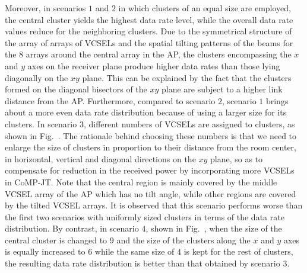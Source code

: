 \documentclass[lettersize,journal]{IEEEtran}
\begin{document}
Moreover, in scenarios $1$ and $2$ in which clusters of an equal size are employed, the central cluster yields the highest data rate level, while the overall data rate values reduce for the neighboring clusters. Due to the symmetrical structure of the array of arrays of \acp{VCSEL} and the spatial tilting patterns of the beams for the $8$ arrays around the central array in the \ac{AP}, the clusters encompassing the $x$ and $y$ axes on the receiver plane produce higher data rates than those lying diagonally on the $xy$ plane. This can be explained by the fact that the clusters formed on the diagonal bisectors of the $xy$ plane are subject to a higher link distance from the \ac{AP}. Furthermore, compared to scenario $2$, scenario $1$ brings about a more even data rate distribution because of using a larger size for its clusters. In scenario $3$, different numbers of \acp{VCSEL} are assigned to clusters, as shown in Fig.~. The rationale behind choosing these numbers is that we need to enlarge the size of clusters in proportion to their distance from the room center, in horizontal, vertical and diagonal directions on the $xy$ plane, so as to compensate for reduction in the received power by incorporating more \acp{VCSEL} in \ac{CoMP}-\ac{JT}. Note that the central region is mainly covered by the middle \ac{VCSEL} array of the \ac{AP} which has no tilt angle, while other regions are covered by the tilted \ac{VCSEL} arrays. It is observed that this scenario performs worse than the first two scenarios with uniformly sized clusters in terms of the data rate distribution. By contrast, in scenario $4$, shown in Fig.~, when the size of the central cluster is changed to $9$ and the size of the clusters along the $x$ and $y$ axes is equally increased to $6$ while the same size of $4$ is kept for the rest of clusters, the resulting data rate distribution is better than that obtained by scenario $3$.

\vspace{-8pt}
\end{document}
